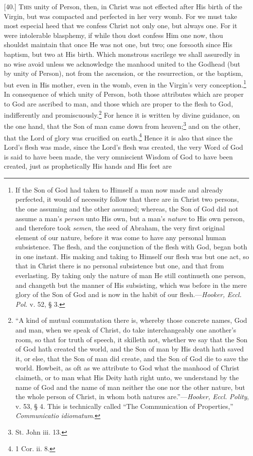 
[40.] \textsc{This} unity of Person, then, in Christ was not effected after His birth of the Virgin, but was compacted and perfected in her very womb. For we must take most especial heed that we confess Christ not only one, but always one. For it were intolerable blasphemy, if while thou dost confess Him one now, thou shouldst maintain that once He was not one, but two; one forsooth since His baptism, but two at His birth. Which monstrous sacrilege we shall assuredly in no wise avoid unless we acknowledge the manhood united to the Godhead (but by unity of Person), not from the ascension, or the resurrection, or the baptism, but even in His mother, even in the womb, even in the Virgin’s very conception.\footnote{If the Son of God had taken to Himself a man now made and already perfected, it would of necessity follow that there are in Christ two persons, the one assuming and the other assumed; whereas, the Son of God did not assume a man’s \emph{person} unto His own, but a man’s \emph{nature} to His own person, and therefore took \emph{semen}, the seed of Abraham, the very first original element of our nature, before it was come to have any personal human subsistence. The flesh, and the conjunction of the flesh with God, began both in one instant. His making and taking to Himself our flesh was but one act, so that in Christ there is no personal subsistence but one, and that from everlasting. By taking only the nature of man He still continueth one person, and changeth but the manner of His subsisting, which was before in the mere glory of the Son of God and is now in the habit of our flesh.—\emph{Hooker, Eccl. Pol.} v. 52, § 3.} In consequence of which unity of Person, both those attributes which are proper to God are ascribed to man, and those which are proper to the flesh to God, indifferently and promiscuously.\footnote{“A kind of mutual commutation there is, whereby those concrete names, God and man, when we speak of Christ, do take interchangeably one another’s room, so that for truth of speech, it skilleth not, whether we say that the Son of God hath created the world, and the Son of man by His death hath saved it, or else, that the Son of man did create, and the Son of God die to save the world. Howbeit, as oft as we attribute to God what the manhood of Christ claimeth, or to man what His Deity hath right unto, we understand by the name of God and the name of man neither the one nor the other nature, but the whole person of Christ, in whom both natures are.”—\emph{Hooker, Eccl. Polity}, v. 53, § 4. This is technically called “The Communication of Properties,” \emph{Communicatio idiomatum}.} For hence it is written by divine guidance, on the one hand, that the Son of man came down from heaven;\footnote{St. John iii. 13.} and on the other, that the Lord of glory was crucified on earth.\footnote{1 Cor. ii. 8.} Hence it is also that since the Lord’s flesh was made, since the Lord’s flesh was created, the very Word of God is said to have been made, the very omniscient Wisdom of God to have been created, just as prophetically His hands and His feet are 